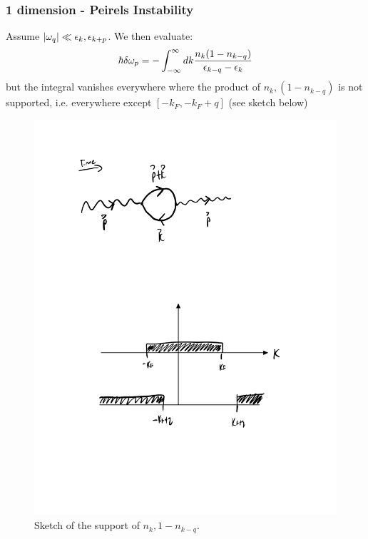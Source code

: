 \subsubsection{1 dimension - Peirels Instability}
Assume $\lvert \omega_q \rvert \ll \epsilon_k, \epsilon_{k+p}$. We then evaluate:
\begin{equation}
    \hbar \delta \omega_p = -\int_{-\infty}^\infty dk \frac{n_k(1 - n_{k-q})}{\epsilon_{k - q} - \epsilon_k}
\end{equation}
but the integral vanishes everywhere where the product of $n_k, (1 - n_{k-q})$ is not supported, i.e. everywhere except $[-k_F, -k_F + q]$ (see sketch below)

\begin{figure}[htbp]
    \centering
    \includegraphics[scale=0.6]{Images/fig-peirelssupport.pdf}
    \caption{Sketch of the support of $n_k, 1 - n_{k-q}$.}
    \label{fig-peirelssupport}
\end{figure}

